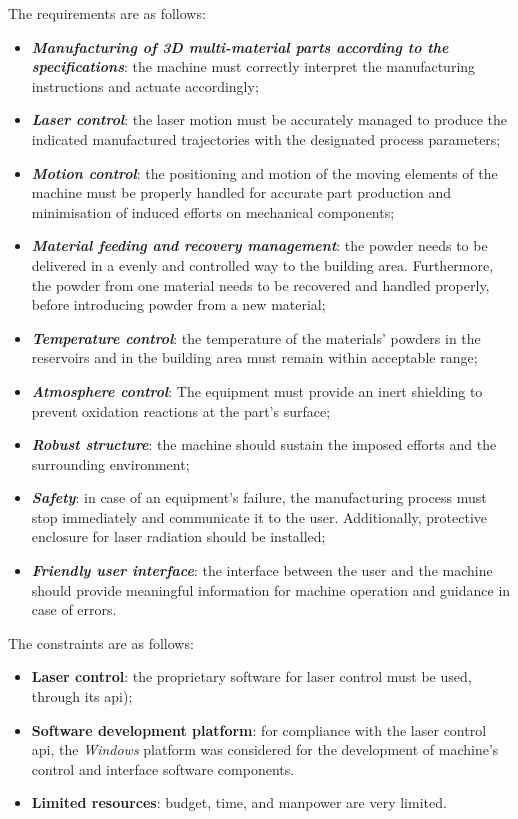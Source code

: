 The requirements are as follows:
\begin{itemize}
\item \textbf{\emph{Manufacturing of 3D multi-material parts according to the
      specifications}}: the machine must correctly interpret the manufacturing
  instructions and actuate accordingly;
\item \textbf{\emph{Laser control}}: the laser motion must be
  accurately managed to produce the indicated manufactured trajectories with the
  designated process parameters;
\item \textbf{\emph{Motion control}}: the positioning and motion of the moving
  elements of the machine must be properly handled for accurate part
  production and minimisation of induced efforts on mechanical components;
\item \textbf{\emph{Material feeding and recovery management}}: the powder needs to be delivered in a
  evenly and controlled way to the building area. Furthermore, the powder from
  one material needs to be recovered and handled properly, before introducing powder from a new material;
\item \textbf{\emph{Temperature control}}: the temperature of the materials'
  powders in the reservoirs and in the building area must remain within
  acceptable range;
\item \textbf{\emph{Atmosphere control}}: The equipment must provide an
  inert shielding to prevent oxidation reactions at the part's surface;
\item \textbf{\emph{Robust structure}}: the machine should sustain the imposed
  efforts and the surrounding environment;
\item \textbf{\emph{Safety}}: in case of an equipment's failure, the manufacturing
  process must stop immediately and communicate it to the user. Additionally,
  protective enclosure for laser radiation should be installed;
\item \textbf{\emph{Friendly user interface}}: the interface between the user
  and the machine should provide meaningful information for machine operation
  and guidance in case of errors.
\end{itemize}%

The constraints are as follows:
\begin{itemize}
\item \textbf{Laser control}: the proprietary software for laser control must be
  used, through its \gls{api});
\item \textbf{Software development platform}: for compliance with the
  laser control \gls{api}, the \emph{Windows} platform was considered for
  the development of machine's control and interface software components.
\item \textbf{Limited resources}: budget, time, and manpower are very limited.
\end{itemize}

